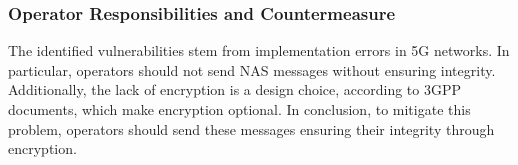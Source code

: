 \documentclass[english]{article}
\begin{document}
\subsubsection{Operator Responsibilities and Countermeasure}
The identified vulnerabilities stem from implementation errors in 5G networks.
In particular, operators should not send NAS messages without ensuring
integrity. Additionally, the lack of encryption is a design choice, according
to 3GPP documents, which make encryption optional. In conclusion, to mitigate
this problem, operators should send these messages ensuring their integrity
through encryption.

\end{document}
